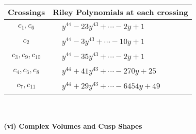 \documentclass[1p]{elsarticle_modified}
\theoremstyle{definition}
\begin{document}
\begin{tabular}{m{50pt}|m{274pt}}
Crossings & \hspace{64pt}Riley Polynomials at each crossing \\
\hline $$\begin{aligned}c_{1},c_{6}\end{aligned}$$&$\begin{aligned}
&y^{44}-23 y^{43}+\cdots-2 y+1
\end{aligned}$\\
\hline $$\begin{aligned}c_{2}\end{aligned}$$&$\begin{aligned}
&y^{44}-3 y^{43}+\cdots-10 y+1
\end{aligned}$\\
\hline $$\begin{aligned}c_{3},c_{9},c_{10}\end{aligned}$$&$\begin{aligned}
&y^{44}-35 y^{43}+\cdots-2 y+1
\end{aligned}$\\
\hline $$\begin{aligned}c_{4},c_{5},c_{8}\end{aligned}$$&$\begin{aligned}
&y^{44}+41 y^{43}+\cdots-270 y+25
\end{aligned}$\\
\hline $$\begin{aligned}c_{7},c_{11}\end{aligned}$$&$\begin{aligned}
&y^{44}+29 y^{43}+\cdots-6454 y+49
\end{aligned}$\\
\hline
\end{tabular}\\~\\
\newpage\flushleft \textbf{(vi) Complex Volumes and Cusp Shapes}
\end{document}
